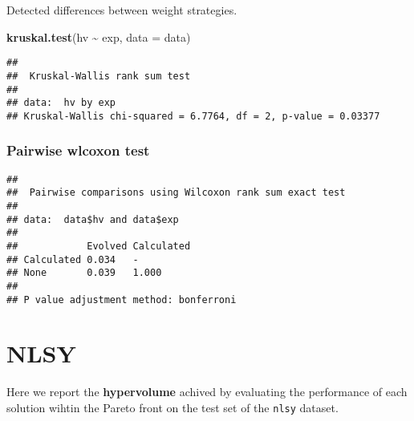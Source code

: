 \documentclass[
]{book}
\newenvironment{Shaded}{\begin{snugshade}}{\end{snugshade}}
\newcommand{\AttributeTok}[1]{\textcolor[rgb]{0.13,0.29,0.53}{#1}}
\newcommand{\ConstantTok}[1]{\textcolor[rgb]{0.56,0.35,0.01}{#1}}
\newcommand{\FunctionTok}[1]{\textcolor[rgb]{0.13,0.29,0.53}{\textbf{#1}}}
\newcommand{\NormalTok}[1]{#1}
\newcommand{\SpecialCharTok}[1]{\textcolor[rgb]{0.81,0.36,0.00}{\textbf{#1}}}
\newcommand{\StringTok}[1]{\textcolor[rgb]{0.31,0.60,0.02}{#1}}
\begin{document}
Detected differences between weight strategies.

\begin{Shaded}
\begin{Highlighting}[]
\FunctionTok{kruskal.test}\NormalTok{(hv }\SpecialCharTok{\textasciitilde{}}\NormalTok{ exp, }\AttributeTok{data =}\NormalTok{ data)}
\end{Highlighting}
\end{Shaded}

\begin{verbatim}
## 
##  Kruskal-Wallis rank sum test
## 
## data:  hv by exp
## Kruskal-Wallis chi-squared = 6.7764, df = 2, p-value = 0.03377
\end{verbatim}

\hypertarget{pairwise-wlcoxon-test-6}{%
\subsection{Pairwise wlcoxon test}\label{pairwise-wlcoxon-test-6}}

\begin{Shaded}
\end{Shaded}

\begin{verbatim}
## 
##  Pairwise comparisons using Wilcoxon rank sum exact test 
## 
## data:  data$hv and data$exp 
## 
##            Evolved Calculated
## Calculated 0.034   -         
## None       0.039   1.000     
## 
## P value adjustment method: bonferroni
\end{verbatim}

\hypertarget{nlsy}{%
\chapter{NLSY}\label{nlsy}}

Here we report the \textbf{hypervolume} achived by evaluating the performance of each solution wihtin the Pareto front on the test set of the \texttt{nlsy} dataset.
\end{document}
